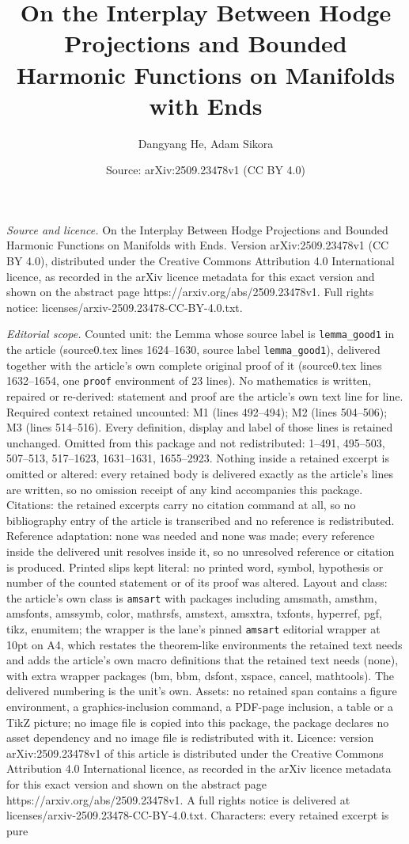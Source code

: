 \documentclass[10pt,a4paper]{amsart}
\title[On the Interplay Between Hodge Projections and Bounded Harmo]{On the Interplay Between Hodge Projections and Bounded Harmonic Functions on Manifolds with Ends}
\author{Dangyang He, Adam Sikora}
\date{Source: arXiv:2509.23478v1 (CC BY 4.0)}
\begin{document}
\maketitle

\noindent\emph{Source and licence.} On the Interplay Between Hodge Projections and Bounded Harmonic Functions on Manifolds with Ends. Version arXiv:2509.23478v1 (CC BY 4.0), distributed under the Creative Commons Attribution 4.0 International licence, as recorded in the arXiv licence metadata for this exact version and shown on the abstract page https://arxiv.org/abs/2509.23478v1. Full rights notice: licenses/arxiv-2509.23478-CC-BY-4.0.txt.\par\smallskip

\noindent\textit{Editorial scope.} Counted unit: the Lemma whose source label is \texttt{lemma\_good1} in the article (source0.tex lines 1624--1630, source label \texttt{lemma\_good1}), delivered together with the article's own complete original proof of it (source0.tex lines 1632--1654, one \texttt{proof} environment of 23 lines). No mathematics is written, repaired or re-derived: statement and proof are the article's own text line for line. Required context retained uncounted: M1 (lines 492--494); M2 (lines 504--506); M3 (lines 514--516). Every definition, display and label of those lines is retained unchanged. Omitted from this package and not redistributed: 1--491, 495--503, 507--513, 517--1623, 1631--1631, 1655--2923. Nothing inside a retained excerpt is omitted or altered: every retained body is delivered exactly as the article's lines are written, so no omission receipt of any kind accompanies this package. Citations: the retained excerpts carry no citation command at all, so no bibliography entry of the article is transcribed and no reference is redistributed. Reference adaptation: none was needed and none was made; every reference inside the delivered unit resolves inside it, so no unresolved reference or citation is produced. Printed slips kept literal: no printed word, symbol, hypothesis or number of the counted statement or of its proof was altered. Layout and class: the article's own class is \texttt{amsart} with packages including amsmath, amsthm, amsfonts, amssymb, color, mathrsfs, amstext, amsxtra, txfonts, hyperref, pgf, tikz, enumitem; the wrapper is the lane's pinned \texttt{amsart} editorial wrapper at 10pt on A4, which restates the theorem-like environments the retained text needs and adds the article's own macro definitions that the retained text needs (none), with extra wrapper packages (bm, bbm, dsfont, xspace, cancel, mathtools). The delivered numbering is the unit's own. Assets: no retained span contains a figure environment, a graphics-inclusion command, a PDF-page inclusion, a table or a TikZ picture; no image file is copied into this package, the package declares no asset dependency and no image file is redistributed with it. Licence: version arXiv:2509.23478v1 of this article is distributed under the Creative Commons Attribution 4.0 International licence, as recorded in the arXiv licence metadata for this exact version and shown on the abstract page https://arxiv.org/abs/2509.23478v1. A full rights notice is delivered at licenses/arxiv-2509.23478-CC-BY-4.0.txt. Characters: every retained excerpt is pure 
\end{document}
